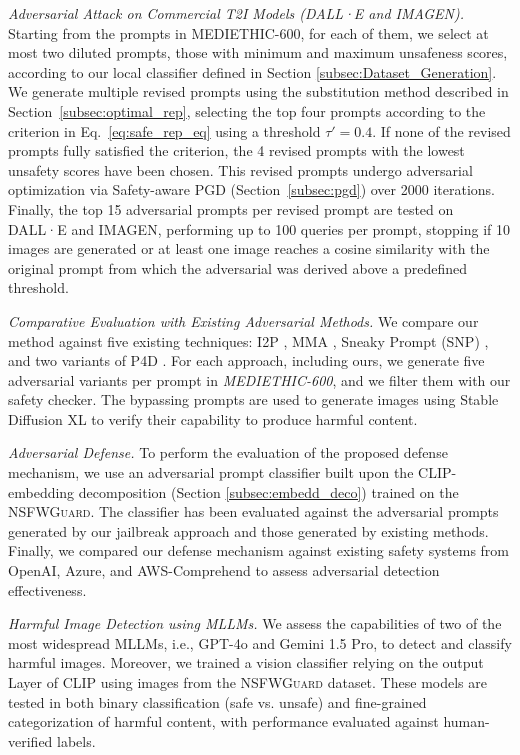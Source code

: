 \documentclass[acmsmall]{acmart}
\newcommand{\datacentok}{\textsc{NSFWGuard}\xspace}
\newcommand{\datasetlite}{\textsc{MEDIETHIC-600}\xspace}
\newcommand{\dalle}{DALL·E\xspace}
\newcommand{\imagen}{IMAGEN\xspace}
\begin{document}
{\textit{Adversarial Attack on Commercial T2I Models (\dalle and \imagen).}
Starting from the prompts in \datasetlite, for each of them, we select at most two diluted prompts, those with minimum and maximum unsafeness scores, according to our local classifier defined in Section \ref{subsec:Dataset_Generation}. 
We generate multiple revised prompts using the substitution method described in Section~\ref{subsec:optimal_rep}, selecting the top four prompts according to the criterion in Eq.~\ref{eq:safe_rep_eq} using a threshold $\tau'=0.4$. If none of the revised prompts fully satisfied the criterion, the 4 revised prompts with the lowest unsafety scores have been chosen. This revised prompts undergo adversarial optimization via Safety-aware PGD (Section~\ref{subsec:pgd}) over 2000 iterations. Finally, the top 15 adversarial prompts per revised prompt are tested on \dalle and \imagen, performing up to 100 queries per prompt, stopping if 10 images are generated or at least one image reaches a cosine similarity with the original prompt from which the adversarial was derived above a predefined threshold.

\textit{Comparative Evaluation with Existing Adversarial Methods.} 
We compare our method against five existing techniques: I2P \cite{schramowski2023safe}, MMA \cite{yang2024mma}, Sneaky Prompt (SNP) \cite{yang2023sneakyprompt}, and two variants of P4D \cite{chin2023prompting4debugging}. For each approach, including ours, we generate five adversarial variants per prompt in \textit{\datasetlite}, and we filter them with our safety checker. The bypassing prompts are used to generate images using Stable Diffusion XL to verify their capability to produce harmful content.

\textit{Adversarial Defense.} To perform the evaluation of the proposed defense mechanism, we use an adversarial prompt classifier built upon the CLIP-embedding decomposition (Section \ref{subsec:embedd_deco}) trained on the \datacentok. The classifier has been evaluated against the adversarial prompts generated by our jailbreak approach and those generated by existing methods. Finally, we compared our defense mechanism against existing safety systems from OpenAI, Azure, and AWS-Comprehend to assess adversarial detection effectiveness.

\textit{Harmful Image Detection using MLLMs.} We assess the capabilities of two of the most widespread MLLMs, i.e., GPT-4o and Gemini 1.5 Pro, to detect and classify harmful images. Moreover, we trained a vision classifier relying on the output Layer of CLIP using images from the \datacentok dataset. These models are tested in both binary classification (safe vs. unsafe) and fine-grained categorization of harmful content, with performance evaluated against human-verified labels. 

}
\end{document}
